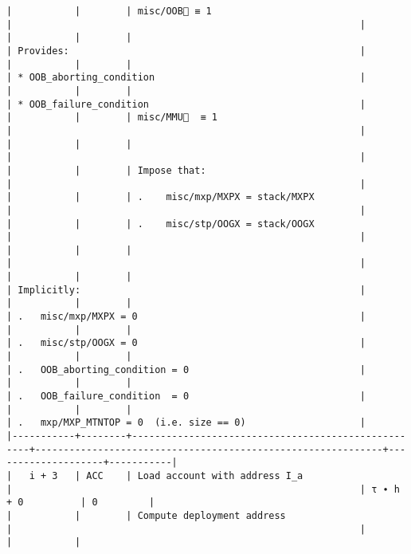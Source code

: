 \documentclass[varwidth=\maxdimen,margin=0.5cm,multi={verbatim}]{standalone}
\begin{document}
\begin{verbatim}
|           |        | misc/OOB🚩 ≡ 1                                     |                                                             |
|           |        |                                                    | Provides:                                                   |
|           |        |                                                    | * OOB_aborting_condition                                    |
|           |        |                                                    | * OOB_failure_condition                                     |
|           |        | misc/MMU🚩  ≡ 1                                    |                                                             |
|           |        |                                                    |                                                             |
|           |        | Impose that:                                       |                                                             |
|           |        | .    misc/mxp/MXPX = stack/MXPX                    |                                                             |
|           |        | .    misc/stp/OOGX = stack/OOGX                    |                                                             |
|           |        |                                                    |                                                             |
|           |        |                                                    | Implicitly:                                                 |
|           |        |                                                    | .   misc/mxp/MXPX = 0                                       |
|           |        |                                                    | .   misc/stp/OOGX = 0                                       |
|           |        |                                                    | .   OOB_aborting_condition = 0                              |
|           |        |                                                    | .   OOB_failure_condition  = 0                              |
|           |        |                                                    | .   mxp/MXP_MTNTOP = 0  (i.e. size == 0)                    |
|-----------+--------+----------------------------------------------------+-------------------------------------------------------------+--------------------+-----------|
|   i + 3   | ACC    | Load account with address I_a                      |                                                             | τ ∙ h + 0          | 0         |
|           |        | Compute deployment address                         |                                                             |                    |           |

\end{verbatim}
\end{document}
